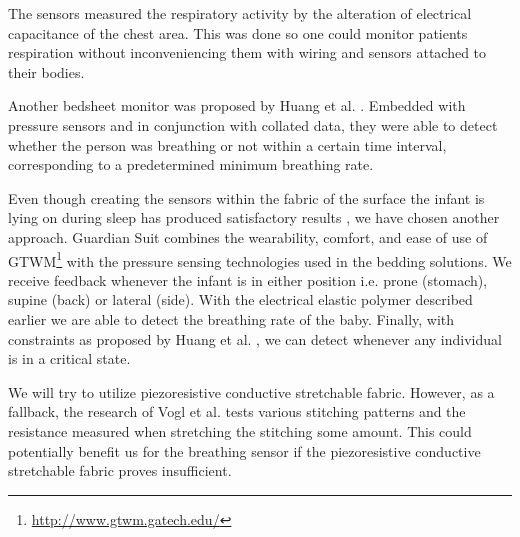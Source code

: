 \documentclass{sigchi-ext}
\begin{document}
    The sensors measured the respiratory activity by the alteration of electrical capacitance of the chest area. This was done so one could monitor patients respiration without inconveniencing them with wiring and sensors attached to their bodies.

Another bedsheet monitor was proposed by Huang et al. \cite{a18-huang}. Embedded with pressure sensors and in conjunction with collated data, they were able to detect whether the person was breathing or not within a certain time interval, corresponding to a predetermined minimum breathing rate.

Even though creating the sensors within the fabric of the surface the infant is lying on during sleep has produced satisfactory results \cite{a18-huang, a33-kroutil}, we have chosen another approach. Guardian Suit combines the wearability, comfort, and ease of use of GTWM\footnote{\url{http://www.gtwm.gatech.edu/}} \cite{p285-fantauzzacoffin} with the pressure sensing technologies used in the bedding solutions. We receive feedback whenever the infant is in either position i.e. prone (stomach), supine (back) or lateral (side). With the electrical elastic polymer described earlier we are able to detect the breathing rate of the baby. Finally, with constraints as proposed by Huang et al. \cite{a18-huang}, we can detect whenever any individual is in a critical state.

We will try to utilize piezoresistive conductive
stretchable fabric. However, as a fallback, the 
research of Vogl et al.\cite{stretcheband}
tests various stitching patterns and the resistance measured
when stretching the stitching some amount. This could 
potentially benefit us for the breathing sensor if the piezoresistive conductive
stretchable fabric proves insufficient.

\end{document}
